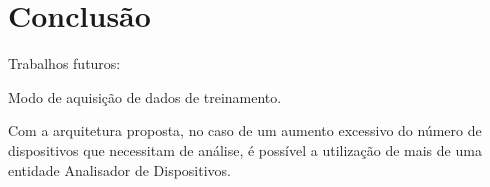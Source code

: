 \chapter{Conclusão}

Trabalhos futuros:

Modo de aquisição de dados de treinamento.

Com a arquitetura proposta, no caso de um aumento excessivo do número de dispositivos que necessitam
de análise, é possível a utilização de mais de uma entidade Analisador de Dispositivos.
